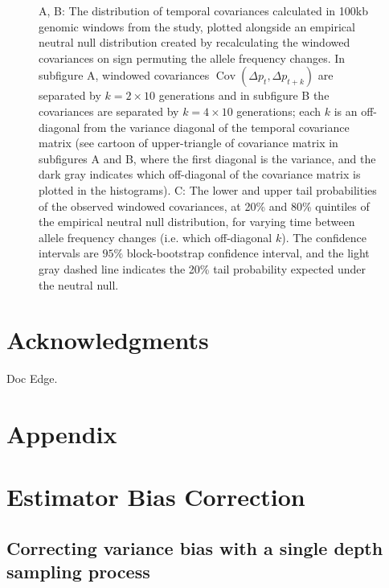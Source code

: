\documentclass[11pt]{article}
\DeclareMathOperator{\cov}{Cov}
\begin{document}
\begin{figure}[!ht]
  \caption{A, B: The distribution of temporal covariances calculated in 100kb
    genomic windows from the \textcite{Barghi2019-qy} study, plotted alongside
    an empirical neutral null distribution created by recalculating the
    windowed covariances on sign permuting the allele frequency changes. In
    subfigure A, windowed covariances $\cov(\Delta p_t, \Delta p_{t+k})$ are
    separated by $k=2 \times 10$ generations and in subfigure B the covariances
    are separated by $k=4 \times 10$ generations; each $k$ is an off-diagonal
    from the variance diagonal of the temporal covariance matrix (see cartoon
    of upper-triangle of covariance matrix in subfigures A and B, where the
    first diagonal is the variance, and the dark gray indicates which
    off-diagonal of the covariance matrix is plotted in the histograms). C: The
    lower and upper tail probabilities of the observed windowed covariances, at
    20\% and 80\% quintiles of the empirical neutral null distribution, for
    varying time between allele frequency changes (i.e. which off-diagonal
    $k$). The confidence intervals are  $95\%$ block-bootstrap confidence
    interval, and the light gray dashed line indicates the 20\% tail
    probability expected under the neutral null.}
  
    \label{fig:figure-3} 
\end{figure}



\section{Acknowledgments} 

Doc Edge.


\section{Appendix}

\section{Estimator Bias Correction}
\subsection{Correcting variance bias with a single depth sampling process}
\label{supp:depth-var-corr}
\end{document}
